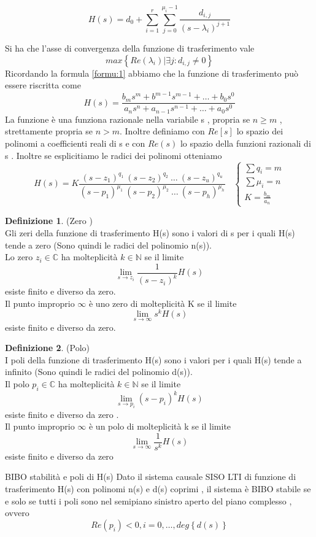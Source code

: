 \documentclass{article}
\theoremstyle{definition}
\newtheorem*{definizione}{Definizione}
\newcommand{\la}{\lambda}
\begin{document}
		\begin{tcolorbox}
		$$	H(s)=d_0 + \sum_{i=1}^{r}\sum_{j=0}^{\mu_i-1} \frac{d_{i,j}}{(s-\la_i)^{j+1}}$$
		\end{tcolorbox}
			Si ha che l'asse di convergenza della funzione di trasferimento vale 
		$$max\left\{Re(\la_i) | \exists j : d_{i,j} \neq 0\right\}$$
		Ricordando la formula \ref{formu:1} abbiamo che la funzione di trasferimento può essere riscritta come 
		$$H(s)=\frac{b_ms^m+b^{m-1}s^{m-1}+\dots + b_0s^0}{a_ns^n+a_{n-1}s^{n-1}+\dots + a_0s^0}$$
		La funzione è una funziona razionale nella variabile s , propria se $n \geq m$ , strettamente propria se $n > m$. Inoltre definiamo con $Re[s]$ lo spazio dei polinomi a coefficienti reali di s e con $Re(s)$ lo spazio della funzioni razionali di s .
		Inoltre se esplicitiamo le radici dei polinomi otteniamo 
		$$H(s)=K\frac{(s-z_1)^{q_1} \ (s-z_2)^{q_2}\ \dots \ (s-z_u)^{q_u}}{(s-p_1)^{\mu_1} \ (s-p_2)^{\mu_2}\ \dots \ (s-p_h)^{\mu_h}} \ \ \ \ \begin{cases}
			\sum q_i = m \\
			\sum \mu_i = n \\
			K=\frac{b_m}{a_n}
		\end{cases}$$ 
		
		
	\begin{definizione} (Zero ) \\
		Gli zeri della funzione di trasferimento H(s) sono i valori di s  per i quali H(s) tende a zero (Sono quindi le radici del polinomio n(s)). \\
		Lo zero $z_i \in \mathbb{C}$ ha molteplicità $k \in \mathbb{N}$ se il limite 
		$$\lim_{s\rightarrow z_i } \frac{1}{(s-z_i)^k}H(s)$$ esiste finito e diverso da zero. \\
		Il punto improprio $\infty$ è uno zero di molteplicità K se il limite 
		$$\lim_{s \rightarrow \infty} s^k H(s)$$ esiste finito e diverso da zero. 
	\end{definizione} 
\begin{definizione}(Polo) \\ 
I poli della funzione di trasferimento H(s) sono i valori per i quali H(s) tende a infinito (Sono quindi le radici del polinomio d(s)). \\
Il polo $p_i \in \mathbb{C}$ ha molteplicità $k \in \mathbb{N}$ se il limite 
$$\lim_{s \rightarrow p_i} (s-p_i)^k H(s)$$ esiste finito e diverso da  zero .\\
Il punto improprio $\infty$ è un polo di molteplicità  k se il limite 
$$\lim_{s \rightarrow \infty  }\frac{1}{s^k}H(s)$$ esiste finito e diverso da zero 
\end{definizione}
\begin{teo}{BIBO stabilità e poli di H(s)}{}
	Dato il sistema causale SISO LTI di funzione di trasferimento H(s) con polinomi n(s) e d(s) coprimi , il sistema è BIBO stabile se e solo se tutti i poli sono nel semipiano sinistro aperto del piano complesso , ovvero $$Re(p_i) < 0 , i= 0 , \dots , deg\left\{d(s)\right\} $$
\end{teo}
\end{document}
